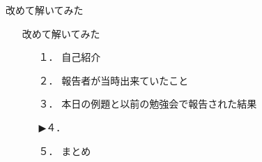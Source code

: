 \begin{frame}{改めて解いてみた}
  \begin{itemize}
      \item[] 改めて解いてみた
      \begin{itemize}[itemsep=1.3ex, leftmargin=1cm]
        \item[１．] {\color{cud_lightgray} 自己紹介}
        \item[２．] {\color{cud_lightgray} 報告者が当時出来ていたこと}
        \item[３．] {\color{cud_lightgray} 本日の例題と以前の勉強会で報告された結果}
        \item[▶４．] 
        \item[５．] まとめ
      \end{itemize}
  \end{itemize}
\end{frame}
